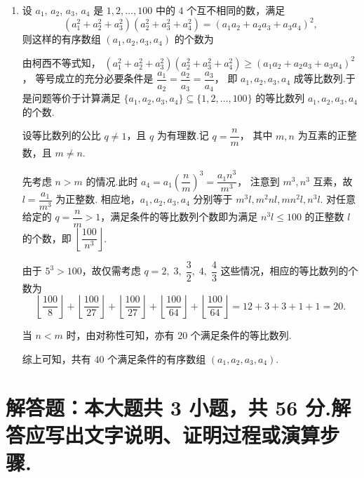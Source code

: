 \documentclass{chsmc}
\begin{document}
\begin{enumerate}
  \item 设 $a_1$, $a_2$, $a_3$, $a_4$ 是 $1, 2, \ldots, 100$ 中的 $4$ 个互不相同的数，满足
    \[
      (a_1^2 + a_2^2 + a_3^2)(a_2^2 + a_3^2 + a_4^2)
      = (a_1 a_2 + a_2 a_3 + a_3 a_4)^2,
    \]
    则这样的有序数组 $(a_1, a_2, a_3, a_4)$ 的个数为\blankline
    \begin{solution}
      由柯西不等式知，
      $(a_1^2 + a_2^2 + a_3^2)(a_2^2 + a_3^2 + a_4^2) \geq (a_1 a_2 + a_2 a_3 + a_3 a_4)^2$，
      等号成立的充分必要条件是
      $\dfrac{a_1}{a_2} = \dfrac{a_2}{a_3} = \dfrac{a_3}{a_4}$，
      即 $a_1, a_2, a_3, a_4$ 成等比数列.于是问题等价于计算满足
      $\{a_1, a_2, a_3, a_4\} \subseteq \{1, 2, \ldots, 100\}$
      的等比数列 $a_1, a_2, a_3, a_4$ 的个数.

      设等比数列的公比 $q \neq 1$，且 $q$ 为有理数.记 $q = \dfrac{n}{m}$，
      其中 $m, n$ 为互素的正整数，且 $m \neq n$.

      先考虑 $n > m$ 的情况.此时
      $a_4 = a_1\left(\dfrac{n}{m}\right)^3 = \dfrac{a_1 n^3}{m^3}$，
      注意到 $m^3, n^3$ 互素，故 $l = \dfrac{a_1}{m^3}$ 为正整数.
      相应地，$a_1, a_2, a_3, a_4$ 分别等于 $m^3 l, m^2 n l, m n^2 l, n^3 l$.
      对任意给定的 $q = \dfrac{n}{m} > 1$，满足条件的等比数列个数即为满足
      $n^3 l \leq 100$ 的正整数 $l$ 的个数，即 $\left\lfloor\dfrac{100}{n^3}\right\rfloor$.

      由于 $5^3 > 100$，故仅需考虑
      $q = 2,\; 3,\; \dfrac{3}{2},\; 4,\; \dfrac{4}{3}$
      这些情况，相应的等比数列的个数为
      \[
        \left\lfloor\frac{100}{8}\right\rfloor
        + \left\lfloor\frac{100}{27}\right\rfloor
        + \left\lfloor\frac{100}{27}\right\rfloor
        + \left\lfloor\frac{100}{64}\right\rfloor
        + \left\lfloor\frac{100}{64}\right\rfloor
        = 12 + 3 + 3 + 1 + 1 = 20.
      \]

      当 $n < m$ 时，由对称性可知，亦有 $20$ 个满足条件的等比数列.

      综上可知，共有 $40$ 个满足条件的有序数组 $(a_1, a_2, a_3, a_4)$.
    \end{solution}
\end{enumerate}

\bigskip
\section{解答题：本大题共 3 小题，共 56 分.解答应写出文字说明、证明过程或演算步骤.}
\end{document}
